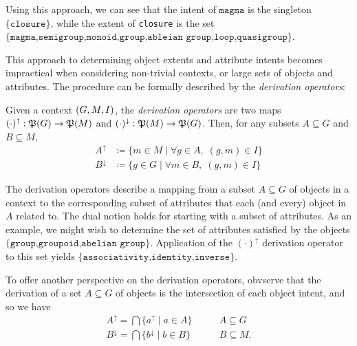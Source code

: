 Using this approach, we can see that the intent of $\texttt{magma}$ is the singleton $\{\texttt{closure}\}$, while the
extent of \texttt{closure} is the set $\{\texttt{magma,semigroup,monoid,group,ableian group,loop,quasigroup}\}$.

This approach to determining object extents and attribute intents becomes impractical when considering non-trivial contexts,
or large sets of objects and attributes. The procedure can be formally described by the \textit{derivation operators}:

\begin{definition}
	 \label{definition:derivation-operators}  

	Given a context $(G,M,\mathrel{I})$, the \textit{derivation operators} are two maps $(\cdot)^{\uparrow}: \mathfrak{P}({G})\to \mathfrak{P}({M})$ and
	$(\cdot )^{\downarrow}: \mathfrak{P}({M})\to \mathfrak{P}({G})$. Then, for any subsets $A \subseteq G$ and $B \subseteq M$,
	\begin{align*}
		A^{\uparrow}   & \coloneqq \{m \in M \mid \forall g \in A, \; (g,m) \in I\} \\
		B^{\downarrow} & \coloneqq \{g \in G \mid \forall m \in B, \; (g,m) \in I\}
	\end{align*}
\end{definition}

The derivation operators describe a mapping from a subset $A \subseteq G$ of objects in a context to the corresponding subset
of attributes that each (and every) object in $A$ related to. The dual notion holds for starting with a subset of
attributes. As an example, we might wish to determine the set of attributes satisfied by the objects
$\{\texttt{group,groupoid,abelian group}\}$. Application of the $(\cdot)^{\uparrow}$ derivation operator to this set yields
$\{\texttt{associativity,identity,inverse}\}$.

To offer another perspective on the derivation operators, obvserve that the derivation of a set $A\subseteq G$ of
objects is the intersection of each object intent, and so we have
\begin{align*}
	A^{\uparrow}= \bigcap \{a^{\uparrow}\mid a \in A\}     & \qquad A \subseteq G  \\
	B^{\downarrow}= \bigcap \{b^{\downarrow}\mid b \in B\} & \qquad B \subseteq M.
\end{align*}

